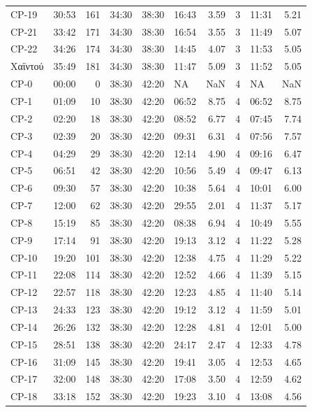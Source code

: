 \documentclass[]{elsarticle} %
\begin{document}
\begin{longtable}[t]{llrlllrllr}
CP-19 & 30:53 & 161 & 34:30 & 38:30 & 16:43 & 3.59 & 3 & 11:31 & 5.21\\
\addlinespace
CP-21 & 33:42 & 171 & 34:30 & 38:30 & 16:54 & 3.55 & 3 & 11:49 & 5.07\\
CP-22 & 34:26 & 174 & 34:30 & 38:30 & 14:45 & 4.07 & 3 & 11:53 & 5.05\\
Χαϊντού & 35:49 & 181 & 34:30 & 38:30 & 11:47 & 5.09 & 3 & 11:52 & 5.05\\
CP-0 & 00:00 & 0 & 38:30 & 42:20 & NA & NaN & 4 & NA & NaN\\
CP-1 & 01:09 & 10 & 38:30 & 42:20 & 06:52 & 8.75 & 4 & 06:52 & 8.75\\
\addlinespace
CP-2 & 02:20 & 18 & 38:30 & 42:20 & 08:52 & 6.77 & 4 & 07:45 & 7.74\\
CP-3 & 02:39 & 20 & 38:30 & 42:20 & 09:31 & 6.31 & 4 & 07:56 & 7.57\\
CP-4 & 04:29 & 29 & 38:30 & 42:20 & 12:14 & 4.90 & 4 & 09:16 & 6.47\\
CP-5 & 06:51 & 42 & 38:30 & 42:20 & 10:56 & 5.49 & 4 & 09:47 & 6.13\\
CP-6 & 09:30 & 57 & 38:30 & 42:20 & 10:38 & 5.64 & 4 & 10:01 & 6.00\\
\addlinespace
CP-7 & 12:00 & 62 & 38:30 & 42:20 & 29:55 & 2.01 & 4 & 11:37 & 5.17\\
CP-8 & 15:19 & 85 & 38:30 & 42:20 & 08:38 & 6.94 & 4 & 10:49 & 5.55\\
CP-9 & 17:14 & 91 & 38:30 & 42:20 & 19:13 & 3.12 & 4 & 11:22 & 5.28\\
CP-10 & 19:20 & 101 & 38:30 & 42:20 & 12:38 & 4.75 & 4 & 11:29 & 5.22\\
CP-11 & 22:08 & 114 & 38:30 & 42:20 & 12:52 & 4.66 & 4 & 11:39 & 5.15\\
\addlinespace
CP-12 & 22:57 & 118 & 38:30 & 42:20 & 12:23 & 4.85 & 4 & 11:40 & 5.14\\
CP-13 & 24:33 & 123 & 38:30 & 42:20 & 19:12 & 3.12 & 4 & 11:59 & 5.01\\
CP-14 & 26:26 & 132 & 38:30 & 42:20 & 12:28 & 4.81 & 4 & 12:01 & 5.00\\
CP-15 & 28:51 & 138 & 38:30 & 42:20 & 24:17 & 2.47 & 4 & 12:33 & 4.78\\
CP-16 & 31:09 & 145 & 38:30 & 42:20 & 19:41 & 3.05 & 4 & 12:53 & 4.65\\
\addlinespace
CP-17 & 32:00 & 148 & 38:30 & 42:20 & 17:08 & 3.50 & 4 & 12:59 & 4.62\\
CP-18 & 33:18 & 152 & 38:30 & 42:20 & 19:23 & 3.10 & 4 & 13:08 & 4.56\\

\end{longtable}
\end{document}
